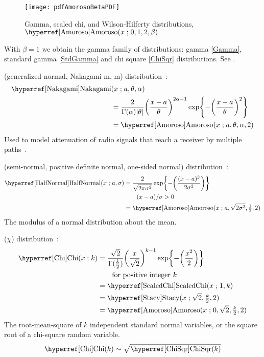 
\begin{figure}[t]
\begin{center}
\texttt{[image: pdfAmorosoBetaPDF]}
\end{center}
\caption[Gamma, scaled chi and Wilson-Hilferty distributions]{Gamma, scaled chi, and Wilson-Hilferty distributions, $\opr{Amoroso}(x\given 0,1,2,\beta)$}
\end{figure}

With $\beta=1$ we obtain the gamma family of distributions: gamma \eqref{Gamma}, standard gamma \eqref{StdGamma} and chi square \eqref{ChiSqr} distributions. See .



 (generalized normal, Nakagami-m, m) distribution~\cite{Nakagami1960}:
\begin{align}
\label{Nakagami}
 \opr{Nakagami}&(x \given a , \theta, \alpha) 
\\ \notag 
& =
 \frac{2}{\Gamma(\alpha) |\theta| }
\Left(\frac{x-a }{\theta}\Right)^{2\alpha -1}
\exp \Left\{
-  \Left(\frac{x-a }{\theta}\Right)^{2}
\Right\}
\checked
\\ \notag
& = \opr{Amoroso}(x\given a,\theta, \alpha ,2) \checked
\notag
\end{align}
Used to model attenuation of radio signals that reach a receiver by multiple paths~\cite{Nakagami1960}.




 (semi-normal, positive definite normal, one-sided normal) distribution~\cite{Johnson1994}:
%
\begin{align}
\label{HalfNormal}
\opr{HalfNormal}(x \given a, \sigma ) 
&= \frac{2}{\sqrt{2\pi \sigma^2}} 
\exp\Left\{-\Left( \frac{(x-a)^2}{2\sigma^2}\Right) \Right\}  
\checked
\\
& \qquad (x-a)/\sigma>0 \notag \\
&=  \opr{Amoroso}(x\given  a, \sqrt{2\sigma^2} , \tfrac{1}{2}, 2) \notag  \checked
\end{align}
The modulus of a normal distribution about the mean.

 ($\chi$) distribution~\cite{Johnson1994}:
%
\begin{align}
\label{Chi}
\opr{Chi}(x \given k) 
&= \frac{ \sqrt{2}}{\Gamma(\tfrac{k}{2})} { \Left(\frac{x}{\sqrt{2}}\Right)}^{k-1} 
\exp\Left\{ -\Left( \frac{x^2}{2}    \Right)\Right\} \checked
\\
& \qquad \text{for positive integer } k \notag \\
& = \opr{ScaledChi}(x\given 1,k) \notag \checked \\
&=  \opr{Stacy}(x\given \sqrt{2}, \sfrac{k}{2}, 2)  \notag \checked \\
&=  \opr{Amoroso}(x\given  0, \sqrt{2} , \sfrac{k}{2}, 2) \notag \checked
\end{align}
The root-mean-square of $k$ independent standard normal variables, or the square root of a chi-square random variable.
\[
\opr{Chi}(k) \sim \sqrt{\opr{ChiSqr}(k)} \checked
\notag
\]

